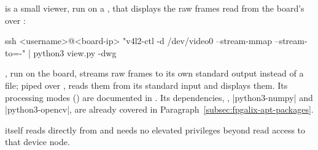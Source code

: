  is a small  viewer, run on a , that displays the raw frames read from the board's  over :

\begin{shellcodehost}
ssh <username>@<board-ip> "v4l2-ctl -d /dev/video0 --stream-mmap --stream-to=-" | python3 view.py -dwg
\end{shellcodehost}

, run on the board, streams raw frames to its own standard output instead of a file; piped over ,  reads them from its standard input and displays them. Its processing modes () are documented in \cite[``view.py --- Live preview'']{DRV2-README}. Its dependencies, , |python3-numpy| and |python3-opencv|, are already covered in Paragraph~\ref{subsec:fpgalix-apt-packages}.

 itself reads directly from  and needs no elevated privileges beyond read access to that device node.
